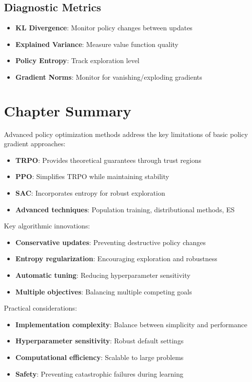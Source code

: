 \subsection{Diagnostic Metrics}

\begin{itemize}
    \item \textbf{KL Divergence}: Monitor policy changes between updates
    \item \textbf{Explained Variance}: Measure value function quality
    \item \textbf{Policy Entropy}: Track exploration level
    \item \textbf{Gradient Norms}: Monitor for vanishing/exploding gradients
\end{itemize}

\section{Chapter Summary}

Advanced policy optimization methods address the key limitations of basic policy gradient approaches:

\begin{itemize}
    \item \textbf{TRPO}: Provides theoretical guarantees through trust regions
    \item \textbf{PPO}: Simplifies TRPO while maintaining stability
    \item \textbf{SAC}: Incorporates entropy for robust exploration
    \item \textbf{Advanced techniques}: Population training, distributional methods, ES
\end{itemize}

Key algorithmic innovations:
\begin{itemize}
    \item \textbf{Conservative updates}: Preventing destructive policy changes
    \item \textbf{Entropy regularization}: Encouraging exploration and robustness
    \item \textbf{Automatic tuning}: Reducing hyperparameter sensitivity
    \item \textbf{Multiple objectives}: Balancing multiple competing goals
\end{itemize}

Practical considerations:
\begin{itemize}
    \item \textbf{Implementation complexity}: Balance between simplicity and performance
    \item \textbf{Hyperparameter sensitivity}: Robust default settings
    \item \textbf{Computational efficiency}: Scalable to large problems
    \item \textbf{Safety}: Preventing catastrophic failures during learning
\end{itemize}

